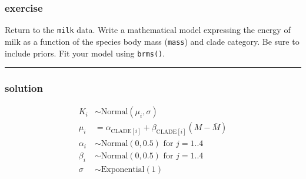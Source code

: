 \documentclass[
  letterpaper,
  DIV=11,
  numbers=noendperiod]{scrartcl}
\begin{document}
\subsubsection{exercise}\label{exercise-2}

Return to the \texttt{milk} data. Write a mathematical model expressing
the energy of milk as a function of the species body mass
(\texttt{mass}) and clade category. Be sure to include priors. Fit your
model using \texttt{brms()}.

\begin{center}\rule{0.5\linewidth}{0.5pt}\end{center}

\subsubsection{solution}\label{solution-4}

\begin{align*}
K_i &\sim \text{Normal}(\mu_i, \sigma) \\
\mu_i &= \alpha_{\text{CLADE}[i]} + \beta_{\text{CLADE}[i]}(M-\bar{M})\\
\alpha_i &\sim \text{Normal}(0, 0.5) \text{ for }j=1..4 \\
\beta_i &\sim \text{Normal}(0, 0.5) \text{ for }j=1..4 \\
\sigma &\sim \text{Exponential}(1) \\
\end{align*}
\end{document}
